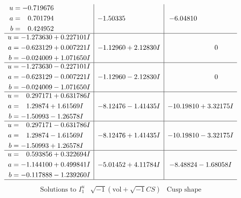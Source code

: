\documentclass[1p]{elsarticle_modified}
\theoremstyle{definition}
\newcommand{\I}{\sqrt{-1}}
\begin{document}
$$\begin{array}{c|c|c}
\begin{aligned}
u &= -0.719676\phantom{ +0.000000I} \\
a &= \phantom{-}0.701794\phantom{ +0.000000I} \\
b &= \phantom{-}0.424952\phantom{ +0.000000I}\end{aligned}
 & -1.50335\phantom{ +0.000000I} & -6.04810\phantom{ +0.000000I} \\ \hline\begin{aligned}
u &= -1.273630 + 0.227101 I \\
a &= -0.623129 + 0.007221 I \\
b &= -0.024009 + 1.071650 I\end{aligned}
 & -1.12960 + 2.12830 I & \phantom{-0.000000 } 0 \\ \hline\begin{aligned}
u &= -1.273630 - 0.227101 I \\
a &= -0.623129 - 0.007221 I \\
b &= -0.024009 - 1.071650 I\end{aligned}
 & -1.12960 - 2.12830 I & \phantom{-0.000000 } 0 \\ \hline\begin{aligned}
u &= \phantom{-}0.297171 + 0.631786 I \\
a &= \phantom{-}1.29874 + 1.61569 I \\
b &= -1.50993 - 1.26578 I\end{aligned}
 & -8.12476 - 1.41435 I & -10.19810 + 3.32175 I \\ \hline\begin{aligned}
u &= \phantom{-}0.297171 - 0.631786 I \\
a &= \phantom{-}1.29874 - 1.61569 I \\
b &= -1.50993 + 1.26578 I\end{aligned}
 & -8.12476 + 1.41435 I & -10.19810 - 3.32175 I \\ \hline\begin{aligned}
u &= \phantom{-}0.593856 + 0.322694 I \\
a &= -1.144100 + 0.499841 I \\
b &= -0.117888 - 1.239260 I\end{aligned}
 & -5.01452 + 4.11784 I & -8.48824 - 1.68058 I\\
 \hline 
 \end{array}$$\newpage$$\begin{array}{c|c|c}  
\text{Solutions to }I^u_{1}& \I (\text{vol} + \sqrt{-1}CS) & \text{Cusp shape}\\
 \hline 
\begin{aligned}

\end{aligned}
\end{array}$$
\end{document}
